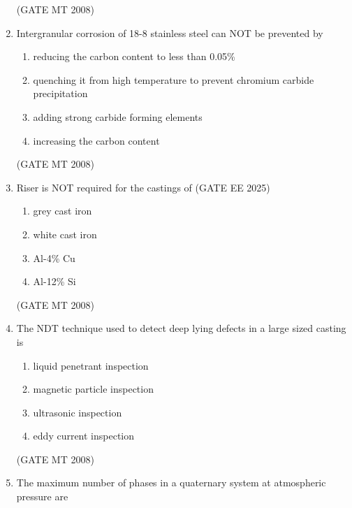 \documentclass[journal, 11pt, onecolumn]{IEEEtran}
\theoremstyle{remark}
\begin{document}
\begin{enumerate}
\hfill(GATE MT 2008)

\item Intergranular corrosion of 18-8 stainless steel can NOT be prevented by

\begin{multicols}{1}
\begin{enumerate}
\item reducing the carbon content to less than 0.05\%
\item quenching it from high temperature to prevent chromium carbide precipitation 
\item adding strong carbide forming elements
\item increasing the carbon content
\end{enumerate}
\end{multicols}

\hfill(GATE MT 2008)

\item Riser is NOT required for the castings of \hfill (GATE EE 2025)

\begin{multicols}{4}
\begin{enumerate}
\item grey cast iron
\item white cast iron 
\item Al-4\% Cu
\item Al-12\% Si
\end{enumerate}
\end{multicols}

\hfill(GATE MT 2008)

\item The NDT technique used to detect deep lying defects in a large sized casting is

\begin{multicols}{2}
\begin{enumerate}
\item liquid penetrant inspection
\item magnetic particle inspection
\item ultrasonic inspection
\item eddy current inspection
\end{enumerate}
\end{multicols}

\hfill(GATE MT 2008)

\item The maximum number of phases in a quaternary system at atmospheric pressure are


\end{enumerate}
\end{document}
